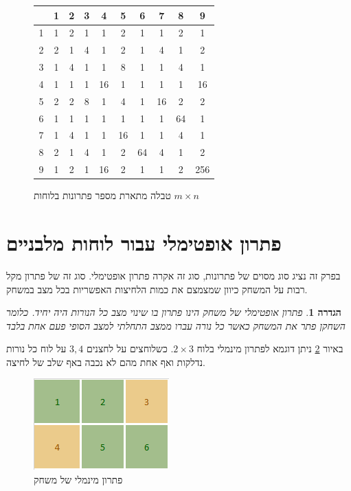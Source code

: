 \documentclass[12pt,leqno]{article}
\theoremstyle{theoremdd}
\newtheorem{definition}{הגדרה}[section]
\begin{document}
\begin{figure}
    \caption{טבלה מתארת מספר פתרונות בלוחות 
    $m \times n$
    }
    \centering
    \label{fig:num-sol-in-table}
    \begin{english}
        \begin{tabular}{ |c||c|c|c|c|c|c|c|c|c| }
            \hline
            \ & 1 & 2 & 3 & 4 & 5 & 6 & 7 & 8 & 9 \\
            \hline
            \hline
            1 & 1 & 2 & 1 & 1 & 2 & 1 & 1 & 2 & 1 \\
            \hline
            2 & 2 & 1 & 4 & 1 & 2 & 1 & 4 & 1 & 2 \\
            \hline
            3 & 1 & 4 & 1 & 1 & 8 & 1 & 1 & 4 & 1 \\
            \hline
            4 & 1 & 1 & 1 & 16 & 1 & 1 & 1 & 1 & 16 \\
            \hline
            5 & 2 & 2 & 8 & 1 & 4 & 1 & 16 & 2 & 2 \\
            \hline
            6 & 1 & 1 & 1 & 1 & 1 & 1 & 1 & 64 & 1 \\
            \hline
            7 & 1 & 4 & 1 & 1 & 16 & 1 & 1 & 4 & 1 \\
            \hline
            8 & 2 & 1 & 4 & 1 & 2 & 64 & 4 & 1 & 2 \\
            \hline
            9 & 1 & 2 & 1 & 16 & 2 & 1 & 1 & 2 & 256 \\
            \hline
        \end{tabular}
    \end{english}
\end{figure}

\section{פתרון אופטימלי עבור לוחות מלבניים}
בפרק זה נציג סוג מסוים של פתרונות,
סוג זה אקרה פתרון אופטימלי.
סוג זה של פתרון מקל רבות על המשחק 
כיוון שמצמצם את כמות הלחיצות האפשריות בכל מצב במשחק.
\begin{definition}
    \label{def: opt-sol}
    פתרון אופטימלי של משחק הינו פתרון 
    בו שינוי מצב כל הנורות 
    היה יחיד.
    כלומר 
    השחקן פתר את המשחק כאשר 
    כל נורה עברו ממצב התחלתי למצב הסופי פעם אחת בלבד
\end{definition}
באיור 
\ref{fig: min sol 2x3}
ניתן דוגמא לפתרון מינמלי 
בלוח 
$2 \times 3$.
כשלוחצים על לחצנים 
$3, 4$
על לוח כל נורות נדלקות ואף 
אחת מהם לא נכבה באף שלב של לחיצה.

\begin{figure}[ht]
    \caption{פתרון מינמלי של משחק}
    \label{fig: min sol 2x3}
    \centering
    \includegraphics[width=.3\textwidth,keepaspectratio]{images/min_sol_2x3.PNG}
\end{figure}
\end{document}
